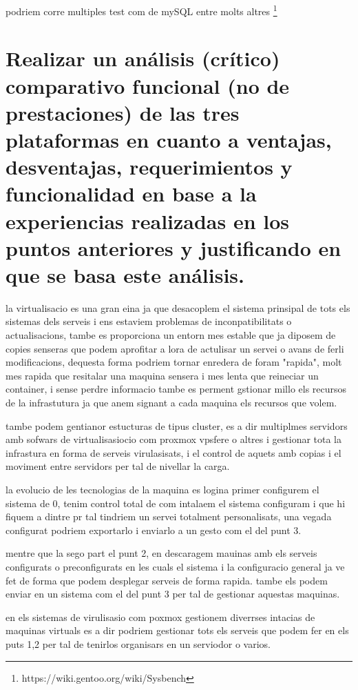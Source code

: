 \documentclass[preprint,11pt]{elsarticle}
\begin{document}
podriem corre multiples test com de mySQL entre molts altres \footnote{https://wiki.gentoo.org/wiki/Sysbench}

\section{Realizar un análisis (crítico) comparativo funcional (no de prestaciones) de las tres plataformas en cuanto a ventajas, desventajas, requerimientos y funcionalidad en base a la experiencias realizadas en los puntos anteriores y justificando en que se basa este análisis.}

la virtualisacio es una gran eina ja que desacoplem el sistema prinsipal de tots els sistemas dels serveis i ens estaviem problemas de inconpatibilitats o actualisacions, tambe es proporciona un entorn mes estable que ja diposem de copies senseras que podem aprofitar a lora de actulisar un servei o avans de ferli modificacions, dequesta forma podriem tornar enredera de foram "rapida", molt mes rapida que resitalar una maquina sensera i mes lenta que reineciar un container, i sense perdre informacio tambe es perment gstionar millo els recursos de la infrastutura ja que anem signant a cada maquina els recursos que volem.\smallskip

tambe podem gentianor estucturas de tipus cluster, es a dir multiplmes servidors amb sofwars de virtualisasiocio com proxmox vpsfere o altres i gestionar tota la infrastura en forma de serveis virulasisats, i el control de aquets amb copias i el moviment entre servidors per tal de nivellar la carga.\smallskip

la evolucio de les tecnologias de la maquina es logina primer configurem el sistema de 0, tenim control total de com intalaem el sistema configuram i que hi fiquem a dintre pr tal tindriem un servei totalment personalisats, una vegada configurat podriem exportarlo i enviarlo a un gesto com el del punt 3.\smallskip

mentre que la sego part el punt 2, en descaragem mauinas amb els serveis configurats o preconfigurats en les cuals el sistema i la configuracio general ja ve fet de forma que podem desplegar serveis de forma rapida. tambe els podem enviar en un sistema com el del punt 3 per tal de gestionar aquestas maquinas.\smallskip

en els sistemas de virulisasio com poxmox gestionem diverrses intacias de maquinas virtuals es a dir podriem gestionar tots els serveis que podem fer en els puts 1,2 per tal de tenirlos organisars en un serviodor o varios.\smallskip
\end{document}
